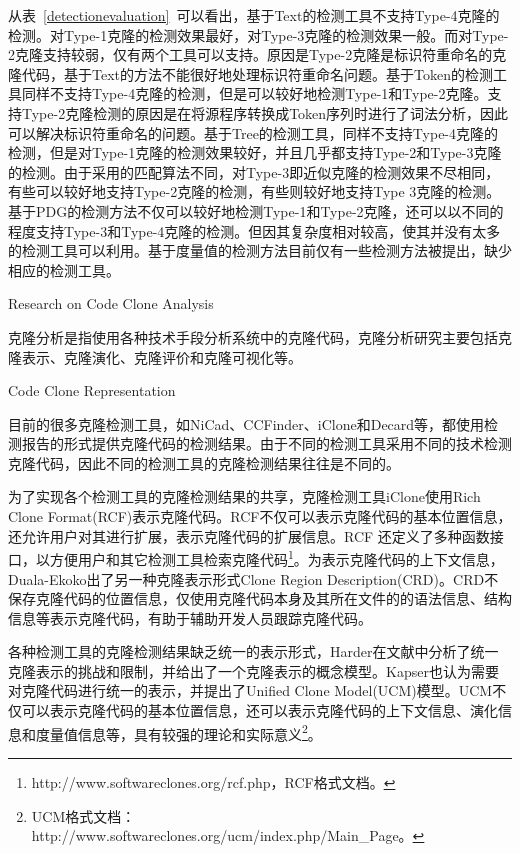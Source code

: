 从表~\ref{detectionevaluation}~可以看出，基于Text的检测工具不支持Type-4克隆的检测。对Type-1克隆的检测效果最好，对Type-3克隆的检测效果一般。而对Type-2克隆支持较弱，仅有两个工具可以支持。原因是Type-2克隆是标识符重命名的克隆代码，基于Text的方法不能很好地处理标识符重命名问题。基于Token的检测工具同样不支持Type-4克隆的检测，但是可以较好地检测Type-1和Type-2克隆。支持Type-2克隆检测的原因是在将源程序转换成Token序列时进行了词法分析，因此可以解决标识符重命名的问题。基于Tree的检测工具，同样不支持Type-4克隆的检测，但是对Type-1克隆的检测效果较好，并且几乎都支持Type-2和Type-3克隆的检测。由于采用的匹配算法不同，对Type-3即近似克隆的检测效果不尽相同，有些可以较好地支持Type-2克隆的检测，有些则较好地支持Type 3克隆的检测。基于PDG的检测方法不仅可以较好地检测Type-1和Type-2克隆，还可以以不同的程度支持Type-3和Type-4克隆的检测。但因其复杂度相对较高，使其并没有太多的检测工具可以利用。基于度量值的检测方法目前仅有一些检测方法被提出\cite{kontogiannis1996pattern,mayrand1996experiment}，缺少相应的检测工具。

{ Research on Code Clone Analysis}

克隆分析是指使用各种技术手段分析系统中的克隆代码，克隆分析研究主要包括克隆表示、克隆演化、克隆评价和克隆可视化等。

{Code Clone Representation}

目前的很多克隆检测工具，如NiCad、CCFinder、iClone和Decard等，都使用检测报告的形式提供克隆代码的检测结果。由于不同的检测工具采用不同的技术检测克隆代码，因此不同的检测工具的克隆检测结果往往是不同的。

为了实现各个检测工具的克隆检测结果的共享，克隆检测工具iClone使用Rich Clone Format(RCF)表示克隆代码\cite{harder2011efficiently}。RCF不仅可以表示克隆代码的基本位置信息，还允许用户对其进行扩展，表示克隆代码的扩展信息。RCF 还定义了多种函数接口，以方便用户和其它检测工具检索克隆代码\footnote{http://www.softwareclones.org/rcf.php，RCF格式文档。}。为表示克隆代码的上下文信息，Duala-Ekoko出了另一种克隆表示形式Clone Region Description(CRD)\cite{duala2010clone}。CRD不保存克隆代码的位置信息，仅使用克隆代码本身及其所在文件的的语法信息、结构信息等表示克隆代码，有助于辅助开发人员跟踪克隆代码。

各种检测工具的克隆检测结果缺乏统一的表示形式，Harder在文献\cite{harder2013limits}中分析了统一克隆表示的挑战和限制，并给出了一个克隆表示的概念模型。Kapser也认为需要对克隆代码进行统一的表示，并提出了Unified Clone Model(UCM)模型\cite{kapser2012common}。UCM不仅可以表示克隆代码的基本位置信息，还可以表示克隆代码的上下文信息、演化信息和度量值信息等，具有较强的理论和实际意义\footnote{ UCM格式文档：http://www.softwareclones.org/ucm/index.php/Main\_Page。}。

